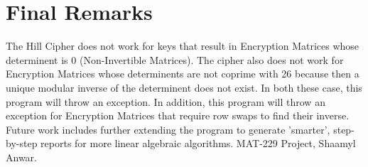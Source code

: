 \documentclass{article}%
\begin{document}
\section{Final Remarks}%
\label{sec:FinalRemarks}%
The Hill Cipher does not work for keys that result in Encryption Matrices whose determinent is 0 (Non{-}Invertible Matrices). The cipher also does not work for Encryption Matrices whose determinents are not coprime with 26 because then a unique modular inverse of the determinent does not exist. In both these case, this program will throw an exception. In addition, this program will throw an exception for Encryption Matrices that require row swaps to find their inverse. Future work includes further extending the program to generate 'smarter', step{-}by{-}step reports for more linear algebraic algorithms. \newline%
 \newline%
%
MAT{-}229 Project, Shaamyl Anwar.

%
\end{document}
